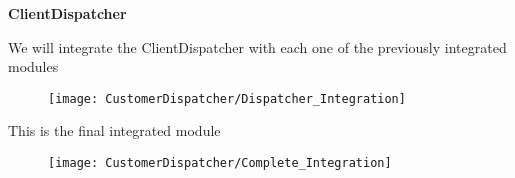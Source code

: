 \textbf{ClientDispatcher}

We will integrate the ClientDispatcher with each one of the previously integrated modules
\begin{figure}[H]
\centering
\texttt{[image: CustomerDispatcher/Dispatcher\_Integration]}
\end{figure}

This is the final integrated module
\begin{figure}[H]
\texttt{[image: CustomerDispatcher/Complete\_Integration]}
\end{figure}